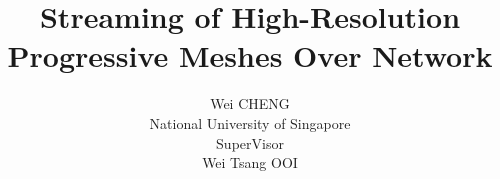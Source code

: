 \documentclass[11pt, a4paper]{report}
\title{Streaming of High-Resolution Progressive Meshes Over Network}
\author{Wei CHENG\\
National University of Singapore\\
SuperVisor\\
Wei Tsang OOI}
\begin{document}
\maketitle
\doublespacing
\begin{abstract}

\end{abstract}
\end{document}
